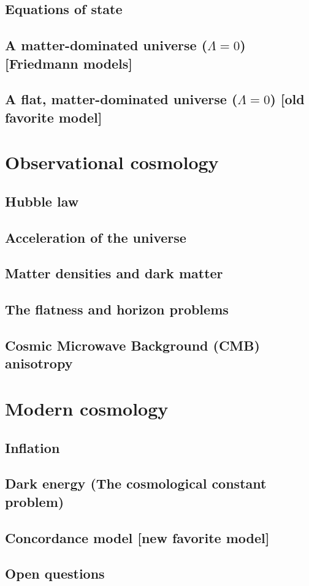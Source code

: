\documentclass{book}
\theoremstyle{definition}
\begin{document}
\subsection{Equations of state}
\subsection{A matter-dominated universe ($\Lambda = 0$) [Friedmann models]}
\subsection{A flat, matter-dominated universe ($\Lambda = 0$) [old favorite model]}
\section{Observational cosmology}
\subsection{Hubble law}
\subsection{Acceleration of the universe}
\subsection{Matter densities and dark matter}
\subsection{The flatness and horizon problems}
\subsection{Cosmic Microwave Background (CMB) anisotropy}
\section{Modern cosmology}
\subsection{Inflation}
\subsection{Dark energy (The cosmological constant problem)}
\subsection{Concordance model [new favorite model]}
\subsection{Open questions}

\newpage
 
\end{document}
